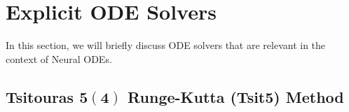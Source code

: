 \section{Explicit ODE Solvers}
\label{subsec:explicit_ode_solvers}

In this section, we will briefly discuss ODE solvers that are relevant in the context of Neural ODEs. %



\subsection{Tsitouras $\mathbf{5 (4)}$ Runge-Kutta (Tsit5) Method}
\label{subsec:tsit5_method}

